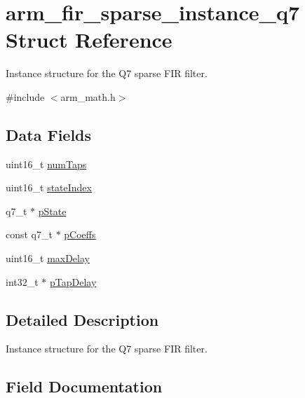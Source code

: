 \hypertarget{structarm__fir__sparse__instance__q7}{}\section{arm\+\_\+fir\+\_\+sparse\+\_\+instance\+\_\+q7 Struct Reference}
\label{structarm__fir__sparse__instance__q7}


Instance structure for the Q7 sparse F\+IR filter.  




{\ttfamily \#include $<$arm\+\_\+math.\+h$>$}

\subsection*{Data Fields}
\begin{DoxyCompactItemize}
\item 
uint16\+\_\+t \mbox{\hyperlink{structarm__fir__sparse__instance__q7_a751941891e47f522a7f5375fe8990aac}{num\+Taps}}
\item 
uint16\+\_\+t \mbox{\hyperlink{structarm__fir__sparse__instance__q7_a566a0cb53437e48b9a3bf18e5b03d8aa}{state\+Index}}
\item 
q7\+\_\+t $\ast$ \mbox{\hyperlink{structarm__fir__sparse__instance__q7_aa8f67102521b620af6f259afdcf29785}{p\+State}}
\item 
const q7\+\_\+t $\ast$ \mbox{\hyperlink{structarm__fir__sparse__instance__q7_abe82cb517dbe44d3938c3b38265870b2}{p\+Coeffs}}
\item 
uint16\+\_\+t \mbox{\hyperlink{structarm__fir__sparse__instance__q7_ab25f4ee7550e6d92acff77ada283733f}{max\+Delay}}
\item 
int32\+\_\+t $\ast$ \mbox{\hyperlink{structarm__fir__sparse__instance__q7_adec00b3793ab4f08edfeb4ea6a9eb6e6}{p\+Tap\+Delay}}
\end{DoxyCompactItemize}


\subsection{Detailed Description}
Instance structure for the Q7 sparse F\+IR filter. 

\subsection{Field Documentation}
\mbox{\label{structarm__fir__sparse__instance__q7_ab25f4ee7550e6d92acff77ada283733f}} 
